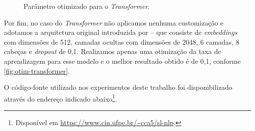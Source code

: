 \begin{figure}[ht!]
    \centering
    \caption{\textmd{Parâmetro otimizado para o \textit{Transformer}.}}
    \nomefonte{}
    \label{fig:otim-transformer}
\end{figure}


Por fim, no caso do \textit{Transformer} não aplicamos nenhuma customização e adotamos a arquitetura original introduzida por  -- que consiste de \textit{embeddings} com dimensões de 512, camadas ocultas com dimensões de 2048, 6 camadas, 8 cabeças e \textit{dropout} de 0,1.
Realizamos apenas uma otimização da taxa de aprendizagem para esse modelo e o melhor resultado obtido é de 0,1, conforme \autoref{fig:otim-transformer}.


O código-fonte utilizado nos experimentos deste trabalho foi disponibilizado através do endereço indicado abaixo\footnote{
    Disponível em \url{https://www.cin.ufpe.br/~cca5/sl-nlp}.
}.





